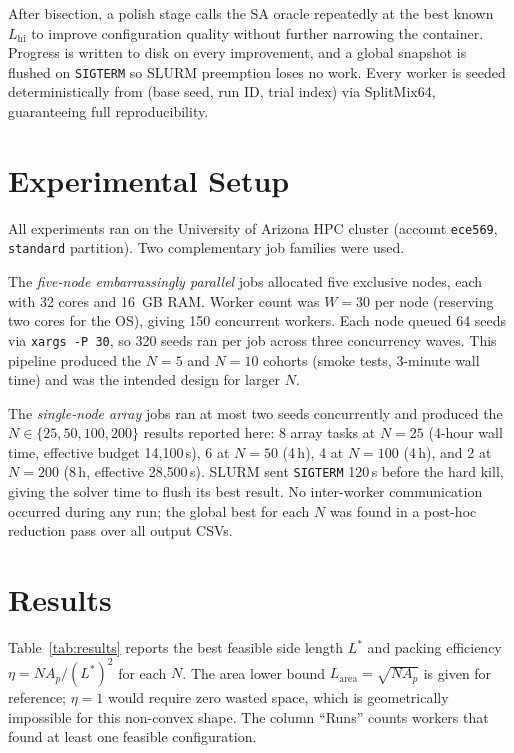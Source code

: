 \documentclass[10pt,twocolumn]{article}
\begin{document}
After bisection, a polish stage calls the SA oracle repeatedly at the
best known $L_{\mathrm{hi}}$ to improve configuration quality without
further narrowing the container. Progress is written to disk on every
improvement, and a global snapshot is flushed on \texttt{SIGTERM} so
SLURM preemption loses no work. Every worker is seeded
deterministically from (base seed, run ID, trial index) via
SplitMix64, guaranteeing full reproducibility.

\section{Experimental Setup}
\label{sec:experiments}

All experiments ran on the University of Arizona HPC cluster (account
\texttt{ece569}, \texttt{standard} partition). Two complementary job
families were used.

The \emph{five-node embarrassingly parallel} jobs allocated five
exclusive nodes, each with 32 cores and 16~GB RAM. Worker count was
$W = 30$ per node (reserving two cores for the OS), giving 150
concurrent workers. Each node queued 64 seeds via \texttt{xargs -P 30},
so 320 seeds ran per job across three concurrency waves. This pipeline
produced the $N = 5$ and $N = 10$ cohorts (smoke tests, 3-minute wall
time) and was the intended design for larger $N$.

The \emph{single-node array} jobs ran at most two seeds concurrently
and produced the $N \in \{25, 50, 100, 200\}$ results reported here:
8 array tasks at $N = 25$ (4-hour wall time, effective budget
14{,}100\,s), 6 at $N = 50$ (4\,h), 4 at $N = 100$ (4\,h), and 2 at
$N = 200$ (8\,h, effective 28{,}500\,s). SLURM sent \texttt{SIGTERM}
120\,s before the hard kill, giving the solver time to flush its best
result. No inter-worker communication occurred during any run; the
global best for each $N$ was found in a post-hoc reduction pass over
all output CSVs.

\section{Results}
\label{sec:results}

Table~\ref{tab:results} reports the best feasible side length $L^*$
and packing efficiency $\eta = N A_p / (L^*)^2$ for each $N$. The
area lower bound $L_{\mathrm{area}} = \sqrt{N A_p}$ is given for
reference; $\eta = 1$ would require zero wasted space, which is
geometrically impossible for this non-convex shape. The column
``Runs'' counts workers that found at least one feasible configuration.
\end{document}

